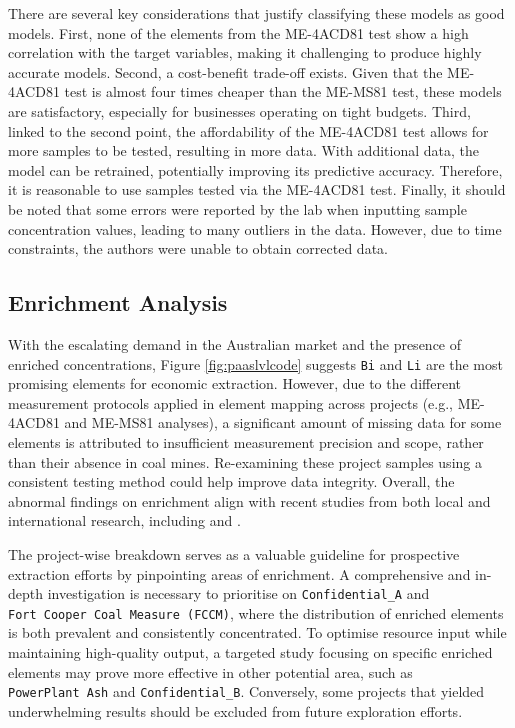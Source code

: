 \documentclass[11pt,a4paper,]{article}
\begin{document}
There are several key considerations that justify classifying these models as good models. First, none of the elements from the ME-4ACD81 test show a high correlation with the target variables, making it challenging to produce highly accurate models. Second, a cost-benefit trade-off exists. Given that the ME-4ACD81 test is almost four times cheaper than the ME-MS81 test, these models are satisfactory, especially for businesses operating on tight budgets. Third, linked to the second point, the affordability of the ME-4ACD81 test allows for more samples to be tested, resulting in more data. With additional data, the model can be retrained, potentially improving its predictive accuracy. Therefore, it is reasonable to use samples tested via the ME-4ACD81 test. Finally, it should be noted that some errors were reported by the lab when inputting sample concentration values, leading to many outliers in the data. However, due to time constraints, the authors were unable to obtain corrected data.

\subsection{Enrichment Analysis}\label{enrichment-analysis-2}

With the escalating demand in the Australian market and the presence of enriched concentrations, Figure \ref{fig:paaslvlcode} suggests \texttt{Bi} and \texttt{Li} are the most promising elements for economic extraction. However, due to the different measurement protocols applied in element mapping across projects (e.g., ME-4ACD81 and ME-MS81 analyses), a significant amount of missing data for some elements is attributed to insufficient measurement precision and scope, rather than their absence in coal mines. Re-examining these project samples using a consistent testing method could help improve data integrity. Overall, the abnormal findings on enrichment align with recent studies from both local and international research, including \autocite{Sun2010} and \autocite{Hodgkinson2020}.

The project-wise breakdown serves as a valuable guideline for prospective extraction efforts by pinpointing areas of enrichment. A comprehensive and in-depth investigation is necessary to prioritise on \texttt{Confidential\_A} and \texttt{Fort\ Cooper\ Coal\ Measure\ (FCCM)}, where the distribution of enriched elements is both prevalent and consistently concentrated. To optimise resource input while maintaining high-quality output, a targeted study focusing on specific enriched elements may prove more effective in other potential area, such as \texttt{PowerPlant\ Ash} and \texttt{Confidential\_B}. Conversely, some projects that yielded underwhelming results should be excluded from future exploration efforts.
\end{document}
